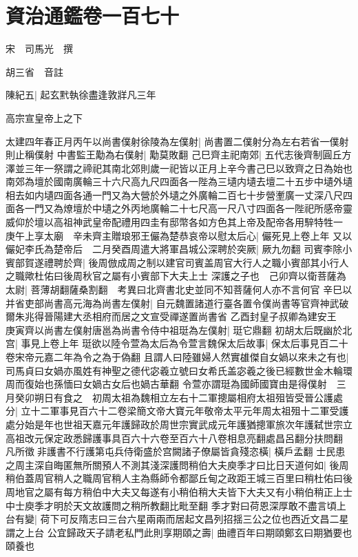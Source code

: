 \section{資治通鑑卷一百七十}
宋　司馬光　撰

胡三省　音註

陳紀五|{
	起玄黓執徐盡逢敦牂凡三年}


高宗宣皇帝上之下

太建四年春正月丙午以尚書僕射徐陵為左僕射|{
	尚書置二僕射分為左右若省一僕射則止稱僕射}
中書監王勱為右僕射|{
	勱莫敗翻}
己巳齊主祀南郊|{
	五代志後齊制圓丘方澤並三年一祭謂之禘祀其南北郊則歲一祀皆以正月上辛今書己巳以致齊之日為始也南郊為壇於國南廣輪三十六尺高九尺四面各一陛為三壝内壝去壇二十五步中壝外壝相去如内壝四面各通一門又為大營於外壝之外廣輪二百七十步營壍廣一丈深八尺四面各一門又為燎壇於中壝之外丙地廣輪二十七尺高一尺八寸四面各一陛祀所感帝靈威仰於壇以高祖神武皇帝配禮用四圭有邸幣各如方色其上帝及配帝各用騂特牲一}
庚午上享太廟　辛未齊主贈琅邪王儼為楚恭哀帝以慰太后心|{
	儼死見上卷上年}
又以儼妃李氏為楚帝后　二月癸酉周遣大將軍昌城公深聘於突厥|{
	厥九勿翻}
司賓李除小賓部賀遂禮聘於齊|{
	後周倣成周之制以建官司賓盖周官大行人之職小賓部其小行人之職歟杜佑曰後周秋官之屬有小賓部下大夫上士}
深護之子也　己卯齊以衛菩薩為太尉|{
	菩薄胡翻薩桑割翻　考異曰北齊書北史並同不知菩薩何人亦不言何官}
辛巳以并省吏部尚書高元海為尚書左僕射|{
	自元魏置諸道行臺各置令僕尚書等官齊神武破爾朱兆得晉陽建大丞相府而居之文宣受禪遂置尚書省}
乙酉封皇子叔卿為建安王　庚寅齊以尚書左僕射唐邕為尚書令侍中祖珽為左僕射|{
	珽它鼎翻}
初胡太后既幽於北宫|{
	事見上卷上年}
珽欲以陸令萱為太后為令萱言魏保太后故事|{
	保太后事見百二十卷宋帝元嘉二年為令之為于偽翻}
且謂人曰陸雖婦人然實䧺傑自女媧以來未之有也|{
	司馬貞曰女媧亦風姓有神聖之德代宓羲立號曰女希氏盖宓羲之後已經數世金木輪環周而復始也孫愐曰女媧古女后也媧古華翻}
令萱亦謂珽為國師國寶由是得僕射　三月癸卯朔日有食之　初周太祖為魏相立左右十二軍摠屬相府太祖殂皆受晉公護處分|{
	立十二軍事見百六十二卷梁簡文帝大寶元年敬帝太平元年周太祖殂十二軍受護處分始是年也世祖天嘉元年護歸政於周世宗實武成元年護猶摠軍旅次年護弑世宗立高祖改元保定政悉歸護事具百六十六卷至百六十八卷相息亮翻處昌呂翻分扶問翻}
凡所徵非護書不行護第屯兵侍衛盛於宫闕諸子僚屬皆貪殘恣橫|{
	橫戶孟翻}
士民患之周主深自晦匿無所關預人不測其淺深護問稍伯大夫庾季才曰比日天道何如|{
	後周稍伯蓋周官稍人之職周官稍人主為縣師令都鄙丘甸之政距王城三百里曰稍杜佑曰後周地官之屬有每方稍伯中大夫又每遂有小稍伯稍大夫皆下大夫又有小稍伯稍正上士中士庾季才明於天文故護問之稍所教翻比毗至翻}
季才對曰荷恩深厚敢不盡言頃上台有變|{
	荷下可反隋志曰三台六星兩兩而居起文昌列招揺三公之位也西近文昌二星謂之上台}
公宜歸政天子請老私門此則享期頤之壽|{
	曲禮百年曰期頤鄭玄曰期猶要也頤養也}
